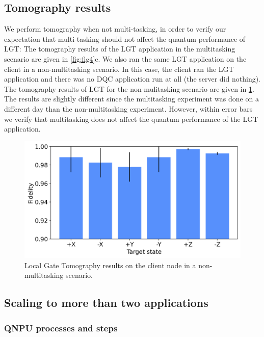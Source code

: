 \subsection{Tomography results}
\label{sec:multitasking-tomography}

We perform tomography when not multi-tasking, in order to verify our expectation that multi-tasking should not affect the quantum performance of \ac{LGT}: The tomography results of the \ac{LGT} application in the multitasking scenario are given in \cref{fig:fig4}c. We also ran the same \ac{LGT} application on the client in a non-multitasking scenario. In this case, the client ran the \ac{LGT} application and there was no \ac{DQC} application run at all (the server did nothing). The tomography results of \ac{LGT} for the non-mulitasking scenario are given in \cref{fig:tomography-no-multitasking}. The results are slightly different since the multitasking experiment was done on a different day than the non-multitasking experiment. However, within error bars we verify that multitasking does not affect the quantum performance of the \ac{LGT} application.

\begin{figure}
\centering
\includegraphics[width=\linewidth]{figures/qnodeos/supplementary/plots/noMT_gate_tomography.png}
\caption{Local Gate Tomography results on the client node in a non-multitasking scenario.}
\label{fig:tomography-no-multitasking}
\end{figure}

\subsection{Scaling to more than two applications}
\label{sec:multitasking-scaling}

\subsubsection{QNPU processes and steps}

